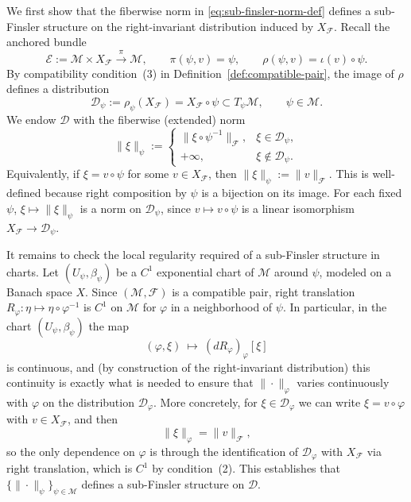 \documentclass[12pt]{amsart}
\numberwithin{equation}{section}
\theoremstyle{remark}
\begin{document}
We first show that the fiberwise norm in \eqref{eq:sub-finsler-norm-def} defines a sub-Finsler structure
on the right-invariant distribution induced by $X_{\mathcal F}$.
Recall the anchored bundle
\begin{equation}
\mathcal E:=\mathcal M\times X_{\mathcal F}
\xrightarrow{\ \pi\ }\mathcal M,
\qquad
\pi(\psi,v)=\psi,
\qquad
\rho(\psi,v)=\iota(v)\circ\psi .
\end{equation}
By compatibility condition~\textup{(3)} in Definition~\ref{def:compatible-pair}, the image of $\rho$ defines a distribution
\begin{equation}
\mathcal D_\psi:=\rho_\psi(X_{\mathcal F})=X_{\mathcal F}\circ\psi
\subset T_\psi\mathcal M,\qquad \psi\in\mathcal M.
\end{equation}
We endow $\mathcal D$ with the fiberwise (extended) norm
\begin{equation}\label{eq:fiber-norm}
\|\xi\|_{\psi}:=
\begin{cases}
\|\xi\circ\psi^{-1}\|_{\mathcal F}, & \xi\in\mathcal D_\psi,\\
+\infty, & \xi\notin\mathcal D_\psi.
\end{cases}
\end{equation}
Equivalently, if $\xi=v\circ\psi$ for some $v\in X_{\mathcal F}$, then $\|\xi\|_\psi:=\|v\|_{\mathcal F}$.
This is well-defined because right composition by $\psi$ is a bijection on its image.
For each fixed $\psi$, $\xi\mapsto \|\xi\|_\psi$ is a norm on $\mathcal D_\psi$, since
$v\mapsto v\circ\psi$ is a linear isomorphism $X_{\mathcal F}\to \mathcal D_\psi$.

It remains to check the local regularity required of a sub-Finsler structure in charts.
Let $(U_\psi,\beta_\psi)$ be a $C^1$ exponential chart of $\mathcal M$ around $\psi$, modeled on a Banach space $X$.
Since $(\mathcal M,\mathcal F)$ is a compatible pair, right translation
$R_\varphi:\eta\mapsto \eta\circ\varphi^{-1}$ is $C^1$ on $\mathcal M$ for $\varphi$ in a neighborhood of $\psi$.
In particular, in the chart $(U_\psi,\beta_\psi)$ the map
\begin{equation}
(\varphi,\xi)\ \longmapsto\ (dR_{\varphi})_{\varphi}[\xi]
\end{equation}
is continuous, and (by construction of the right-invariant distribution) this continuity is exactly what
is needed to ensure that $\|\cdot\|_\varphi$ varies continuously with $\varphi$ on the distribution $\mathcal D_\varphi$.
More concretely, for $\xi\in\mathcal D_\varphi$ we can write $\xi=v\circ\varphi$ with $v\in X_{\mathcal F}$, and then
\begin{equation}
\|\xi\|_\varphi=\|v\|_{\mathcal F},
\end{equation}
so the only dependence on $\varphi$ is through the identification of $\mathcal D_\varphi$ with $X_{\mathcal F}$ via right translation,
which is $C^1$ by condition~\textup{(2)}.
This establishes that $\{\|\cdot\|_\psi\}_{\psi\in\mathcal M}$ defines a sub-Finsler structure on $\mathcal D$.
\end{document}
